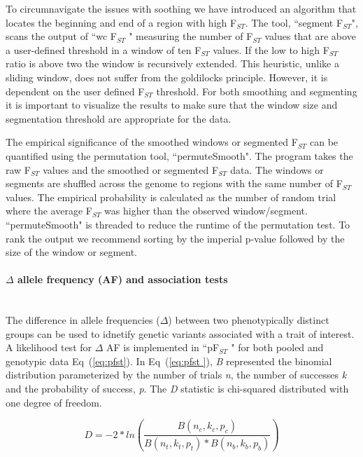 \documentclass[10pt,letterpaper]{article}
\begin{document}
To circumnavigate the issues with soothing we have introduced an algorithm that locates the beginning and end of a region with high  F$_{ST}$.  The tool, ``segment F$_{ST}$", scans the output of ``wc F$_{ST}$ " measuring the number of  F$_{ST}$  values that are above a user-defined threshold in a window of ten F$_{ST}$ values.  If the low to high  F$_{ST}$  ratio is above two the window is recursively extended.  This heuristic, unlike a sliding window, does not suffer from the goldilocks principle.  However, it is dependent on the user defined F$_{ST}$ threshold.  For both smoothing and segmenting it is important to visualize the results to make sure that the window size and segmentation threshold are appropriate for the data.

The empirical significance of the smoothed windows or segmented  F$_{ST}$ can be quantified using the permutation tool, ``permuteSmooth".  The program takes the raw F$_{ST}$ values and the smoothed or segmented F$_{ST}$  data.  The windows or segments are shuffled across the genome to regions with the same number of  F$_{ST}$  values.  The empirical probability is calculated as the number of random trial where the average  F$_{ST}$  was higher than the observed window/segment.  ``permuteSmooth" is threaded to reduce the runtime of the permutation test.  To rank the output we recommend sorting by the imperial p-value followed by the size of the window or segment.

\paragraph*{$\Delta$ allele frequency (AF) and association tests} \mbox{} \\

The difference in allele frequencies ($\Delta$) between two phenotypically distinct groups can be used to idnetify genetic variants associated with a trait of interest.  A likelihood test for $\Delta$ AF is implemented in ``pF$_{ST}$ " for both pooled and genotypic data Eq~(\ref{eq:pfst}).   In Eq~(\ref{eq:pfst }), \textit{B} represented the binomial distribution parameterized by the number of trials \textit{n}, the number of successes \textit{k} and the probability of success, \textit{p}.  The \textit{D} statistic is chi-squared distributed with one degree of freedom.

\begin{equation}\label{eq:pfst} 
D=-2* ln (\frac{ B(n_c,k_c,p_c) }{ B(n_t,k_t,p_t)*B(n_b,k_b,p_b)  })
\end{equation}
\end{document}
